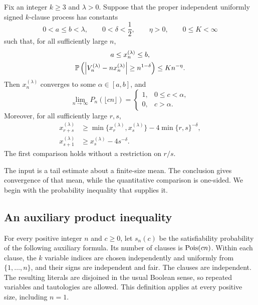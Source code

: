 \begin{samepage}
\begin{theorem}
\label{thm:concentration-to-convergence}
Fix an integer \(k\ge3\) and \(\lambda>0\).  Suppose that the proper
independent uniformly signed \(k\)-clause process has constants
\[
 0<a\le b<\lambda,\qquad 0<\delta<\frac12,\qquad
 \eta>0,\qquad 0\le K<\infty
\]
such that, for all sufficiently large \(n\),
\begin{equation}\label{eq:convergence-input}
\begin{gathered}
 a\le x_n^{(\lambda)}\le b,\\
 \mathbb P\left(\left|V_n^{(\lambda)}-nx_n^{(\lambda)}\right|
             \ge n^{1-\delta}\right)\le K n^{-\eta}.
\end{gathered}
\end{equation}
Then \(x_n^{(\lambda)}\) converges to some \(\alpha\in[a,b]\), and
\[
 \lim_{n\to\infty}P_n(\lfloor cn\rfloor)=
 \begin{cases}
  1,&0\le c<\alpha,\\
  0,&c>\alpha.
 \end{cases}
\]
Moreover, for all sufficiently large \(r,s\),
\begin{align}
 x_{r+s}^{(\lambda)}
 &\ge\min\{x_r^{(\lambda)},x_s^{(\lambda)}\}
       -4\min\{r,s\}^{-\delta},\label{eq:convergence-sum}\\
 x_{s+1}^{(\lambda)}
 &\ge x_s^{(\lambda)}-4s^{-\delta}.
 \label{eq:convergence-neighbor}
\end{align}
The first comparison holds without a restriction on \(r/s\).
\end{theorem}
\end{samepage}

The input is a tail estimate about a finite-size mean.  The conclusion
gives convergence of that mean, while the quantitative comparison is
one-sided.  We begin with the probability inequality that supplies it.

\subsection{An auxiliary product inequality}

For every positive integer \(n\) and \(c\ge0\), let \(s_n(c)\) be the
satisfiability probability of the following auxiliary formula.  Its number
of clauses is \(\operatorname{Pois}(cn)\).  Within each clause, the \(k\) variable indices
are chosen independently and uniformly from \(\{1,\ldots,n\}\), and their
signs are independent and fair.  The clauses are independent.  The
resulting literals are disjoined in the usual Boolean sense, so repeated
variables and tautologies are allowed.  This definition applies at every
positive size, including \(n=1\).

